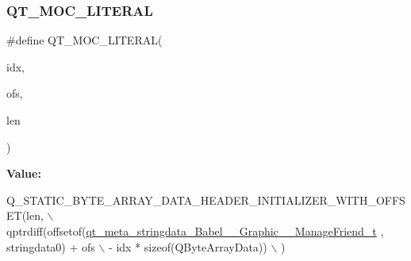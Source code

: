 \subsubsection{\texorpdfstring{Q\+T\+\_\+\+M\+O\+C\+\_\+\+L\+I\+T\+E\+R\+AL}{QT\_MOC\_LITERAL}}
{\footnotesize\ttfamily \#define Q\+T\+\_\+\+M\+O\+C\+\_\+\+L\+I\+T\+E\+R\+AL(\begin{DoxyParamCaption}\item[{}]{idx,  }\item[{}]{ofs,  }\item[{}]{len }\end{DoxyParamCaption})}

{\bfseries Value\+:}
\begin{DoxyCode}
Q\_STATIC\_BYTE\_ARRAY\_DATA\_HEADER\_INITIALIZER\_WITH\_OFFSET(len, \(\backslash\)
    qptrdiff(offsetof(\hyperlink{structqt__meta__stringdata__Babel____Graphic____ManageFriend__t}{qt\_meta\_stringdata\_Babel\_\_Graphic\_\_ManageFriend\_t}
      , stringdata0) + ofs \(\backslash\)
        - idx * \textcolor{keyword}{sizeof}(QByteArrayData)) \(\backslash\)
    )
\end{DoxyCode}
